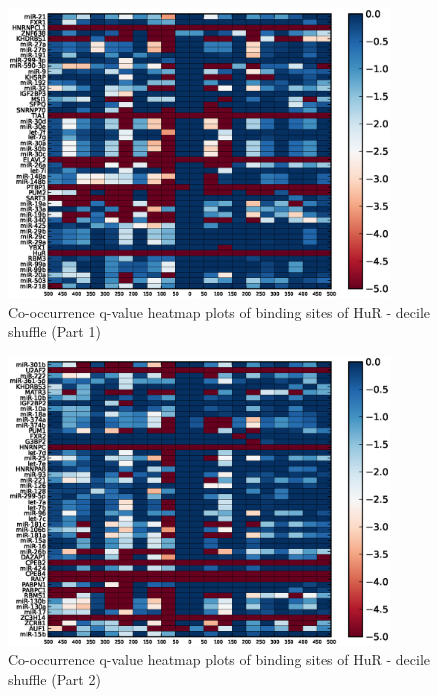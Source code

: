 \begin{figure}
   	\includegraphics[width=0.9\textwidth]{appendix1/figures/HuR_decile_expressed_heatmap_qvalues0.eps}
   	\caption{Co-occurrence q-value heatmap plots of binding sites of HuR - decile shuffle (Part 1)}
\end{figure}
\clearpage
\begin{figure}
   	\includegraphics[width=0.9\textwidth,clip]{appendix1/figures/HuR_decile_expressed_heatmap_qvalues1.eps}
   	\caption{Co-occurrence q-value heatmap plots of binding sites of HuR - decile shuffle (Part 2)}
\end{figure}

